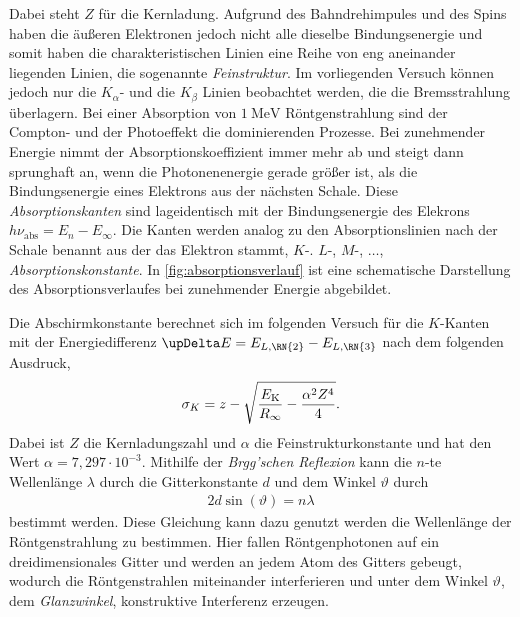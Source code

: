 Dabei steht $Z$ für die Kernladung.\newline
Aufgrund des Bahndrehimpules und des Spins haben die äußeren Elektronen jedoch nicht alle dieselbe Bindungsenergie und somit haben die charakteristischen Linien eine Reihe von eng
aneinander liegenden Linien, die sogenannte \textit{Feinstruktur}. Im vorliegenden Versuch können jedoch nur die $K_\alpha$- und die $K_\beta$ Linien beobachtet werden, die die Bremsstrahlung überlagern. \newline
Bei einer Absorption von $\SI{1}{\mega\eV}$ Röntgenstrahlung sind der Compton- und der Photoeffekt die dominierenden Prozesse. Bei zunehmender Energie nimmt
der Absorptionskoeffizient immer mehr ab und steigt dann sprunghaft an, wenn die Photonenenergie gerade größer ist, als die Bindungsenergie eines Elektrons aus der nächsten Schale. Diese
\textit{Absorptionskanten} sind lageidentisch mit der Bindungsenergie des Elekrons $h\nu_{\text{abs}} = E_n - E_\infty$. Die Kanten werden analog zu den Absorptionslinien nach der Schale benannt aus der das Elektron stammt, $K$-. $L$-, $M$-, $\dots$, \textit{Absorptionskonstante}.
In \autoref{fig:absorptionsverlauf} ist eine schematische Darstellung des Absorptionsverlaufes bei zunehmender Energie abgebildet.

Die Abschirmkonstante berechnet sich im folgenden Versuch für die $K$-Kanten mit der Energiedifferenz $\upDelta E = E_{L, \RN{2}} - E_{L, \RN{3}}$ nach dem folgenden Ausdruck,
\begin{align}
    \label{eqn:abschirmkonstante}
    \sigma_K = z - \sqrt{\frac{E_{\text K}}{R_\infty} - \frac{\alpha^2 Z^4}{4}}.
\end{align}
Dabei ist $Z$ die Kernladungszahl und $\alpha$ die Feinstrukturkonstante und hat den Wert $\alpha = 7,297\cdot 10^{-3}$.
Mithilfe der \textit{Brgg'schen Reflexion} kann die $n$-te Wellenlänge $\lambda$ durch die Gitterkonstante $d$ und dem Winkel $\vartheta$ durch 
\begin{align}
    \label{eqn:bragg}
    2d\sin(\vartheta)=n\lambda
\end{align}
bestimmt werden. Diese Gleichung kann dazu genutzt werden die Wellenlänge der Röntgenstrahlung zu bestimmen. Hier fallen Röntgenphotonen auf ein dreidimensionales Gitter und werden an jedem Atom des
Gitters gebeugt, wodurch die Röntgenstrahlen miteinander interferieren und unter dem Winkel $\vartheta$, dem \textit{Glanzwinkel}, konstruktive Interferenz erzeugen.